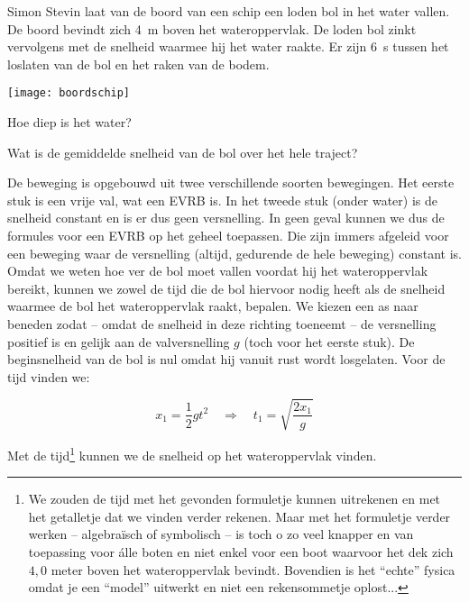 \documentclass{ximera}
\begin{document}
\begin{exercise}
Simon Stevin laat van de boord van een schip een loden bol in het water vallen. De \mbox{boord} bevindt zich \SI{4}{\meter} boven het wateroppervlak. De loden bol zinkt vervolgens met de snelheid waarmee hij het water raakte. Er zijn \SI{6}{\second} tussen het loslaten van de bol en het raken van de bodem. 

\begin{image}
	\texttt{[image: boordschip]}
\end{image}

\begin{question} Hoe diep is het water? \end{question}
\begin{question} Wat is de gemiddelde snelheid van de bol over het hele traject? \end{question}

\begin{oplossing}
De beweging is opgebouwd uit twee verschillende soorten bewegingen. Het eerste stuk is een vrije val, wat een EVRB is. In het tweede stuk (onder water) is de snelheid constant en is er dus geen versnelling. In geen geval kunnen we dus de formules voor een EVRB op het geheel toepassen. Die zijn immers afgeleid voor een beweging waar de versnelling (altijd, gedurende de hele beweging) constant is. \\

Omdat we weten hoe ver de bol moet vallen voordat hij het wateroppervlak bereikt, kunnen we zowel de tijd die de bol hiervoor nodig heeft als de snelheid waarmee de bol het wateroppervlak raakt, bepalen. We kiezen een as naar beneden zodat -- omdat de snelheid in deze richting toeneemt -- de versnelling positief is en gelijk aan de valversnelling $g$ (toch voor het eerste stuk). De beginsnelheid van de bol is nul omdat hij vanuit rust wordt losgelaten. Voor de tijd vinden we:

\[
x_1=\frac{1}{2}gt^2\quad\Rightarrow\quad t_1=\sqrt{\frac{2x_1}{g}}
\]

Met de tijd\footnote{We zouden de tijd met het gevonden formuletje kunnen uitrekenen en met het getalletje dat we vinden verder rekenen. Maar met het formuletje verder werken -- algebra\"isch of symbolisch -- is toch o zo veel knapper en van toepassing voor \'alle boten en niet enkel voor een boot waarvoor het dek zich $4,0$ meter boven het wateroppervlak bevindt. Bovendien is het ``echte'' fysica omdat je een ``model'' uitwerkt en niet een rekensommetje oplost...} kunnen we de snelheid op het wateroppervlak vinden.


\end{oplossing}
\end{exercise}
\end{document}
